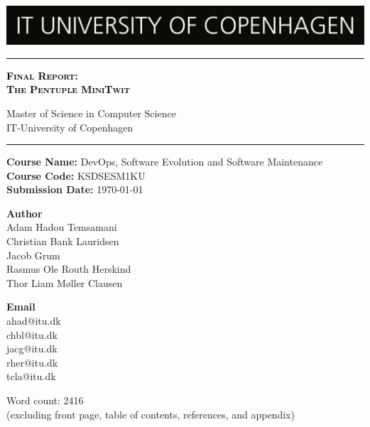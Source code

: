 
\begin{titlepage}

    \centering
    \includegraphics[width=\textwidth]{images/ITU_logo.jpg}
        \textcolor{black}{\rule{\linewidth}{1pt}} \par
         {\scshape\Huge\bfseries \textcolor{black}{Final Report: \\ The Pentuple MiniTwit}\par} 
        \vspace{1pt} {Master of Science in Computer Science \\ 
        IT-University of Copenhagen \par}
        \textcolor{black}{\rule{\linewidth}{1pt}} \par
        \vspace*{0.25cm}
     \textbf{Course Name:} DevOps, Software Evolution and Software Maintenance \\
    \textbf{Course Code:} KSDSESM1KU \\
    \textbf{Submission Date:} \today\\
     
    \vspace*{0.25cm}
     
    \begin{minipage}{0.75\textwidth}
        \begin{flushleft} \large
            \textbf{Author}\\
            Adam Hadou Temsamani \\
            Christian Bank Lauridsen \\
            Jacob Grum \\
            Rasmus Ole Routh Herskind \\
            Thor Liam Møller Clausen
        \end{flushleft}
        \end{minipage}
        \begin{minipage}{0.20\textwidth}
        \begin{flushright} \large
            \textbf{Email}\\
            ahad@itu.dk \\
            chbl@itu.dk \\
            jacg@itu.dk \\
            rher@itu.dk \\
            tcla@itu.dk
        \end{flushright}
    \end{minipage}

    \vspace{2cm}

    Word count: 2416\\
    (excluding front page, table of contents, references, and appendix)
    \end{titlepage}
    